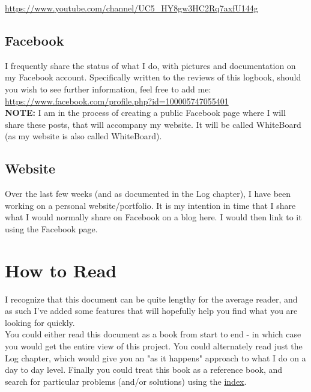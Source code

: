             \url{https://www.youtube.com/channel/UC5_HY8gw3HC2Rq7axfU144g}\\            
        
        \subsection*{Facebook}
        \label{subsec:Facebook}
            I frequently share the status of what I do, with pictures and documentation on my Facebook account. Specifically written to the reviews of this logbook, should you wish to see further information, feel free to add me:\\
            
            \url{https://www.facebook.com/profile.php?id=100005747055401}\\
            
            \textbf{NOTE:} I am in the process of creating a public Facebook page where I will share these posts, that will accompany my website. It will be called WhiteBoard (as my website is also called WhiteBoard).\\
            
        \subsection*{Website}
            Over the last few weeks (and as documented in the Log chapter), I have been working on a personal website/portfolio. It is my intention in time that I share what I would normally share on Facebook on a blog here. I would then link to it using the Facebook page.\\

    \section*{How to Read}
        I recognize that this document can be quite lengthy for the average reader, and as such I've added some features that will hopefully help you find what you are looking for quickly.\\
        
        You could either read this document as a book from start to end - in which case you would get the entire view of this project. You could alternately read just the Log chapter, which would give you an "as it happens" approach to what I do on a day to day level. Finally you could treat this book as a reference book, and search for particular problems (and/or solutions) using the \hyperref[index]{index}.\\        
        

